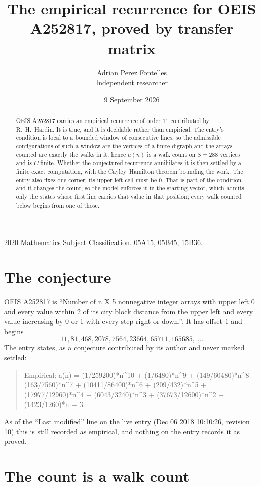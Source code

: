 \documentclass[11pt,a4paper]{article}
\title{The empirical recurrence for OEIS A252817, proved by transfer matrix}
\author{Adrian Perez Fontelles\\ \small Independent researcher}
\date{9 September 2026}
\theoremstyle{plain}
\theoremstyle{definition}
\begin{document}
\maketitle

\begin{abstract}
OEIS A252817 carries an empirical recurrence of order $11$ contributed by R.~H.~Hardin. It is
true, and it is decidable rather than empirical. The entry's condition is local to a bounded window of consecutive lines, so
the admissible configurations of such a window are the vertices of a finite digraph and the
arrays counted are exactly the walks in it; hence $a(n)$ is a walk count on $S=288$ vertices
and is $C$-finite. Whether the conjectured recurrence annihilates it is then settled by a
finite exact computation, with the Cayley--Hamilton theorem bounding the work.
 The entry also fixes one corner: its upper left cell must be $0$. That is part of the condition and it changes the count, so the model enforces it in the starting vector, which admits only the states whose first line carries that value in that position; every walk counted below begins from one of those.\end{abstract}

\noindent\small 2020 Mathematics Subject Classification. 05A15, 05B45, 15B36.\normalsize

\section{The conjecture}

OEIS A252817 is ``Number of n X 5 nonnegative integer arrays with upper left 0 and every value within 2 of its city block distance from the upper left and every value increasing by 0 or 1 with every step right or down.''. It has offset $1$ and begins
\[
11, 81, 468, 2078, 7564, 23664, 65711, 165685,\ \dots
\]
The entry states, as a conjecture contributed by its author and never marked settled:
\begin{quote}
Empirical: a(n) = (1/259200)*n\^{}10 + (1/6480)*n\^{}9 + (149/60480)*n\^{}8 + (163/7560)*n\^{}7 + (10411/86400)*n\^{}6 + (209/432)*n\^{}5 + (17977/12960)*n\^{}4 + (6043/3240)*n\^{}3 + (37673/12600)*n\^{}2 + (1423/1260)*n + 3.
\end{quote}
As of the ``Last modified'' line on the live entry (Dec 06 2018 10:10:26, revision 10) this is still
recorded as empirical, and nothing on the entry records it as proved.

\section{The count is a walk count}
\end{document}
